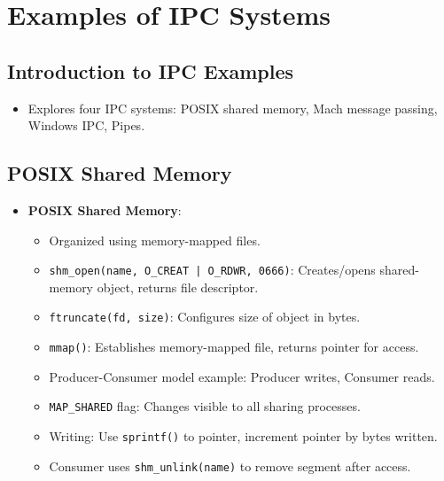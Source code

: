 \section{Examples of IPC Systems}\label{sec:3.7}

\subsection{Introduction to IPC Examples}
\begin{itemize}
    \item Explores four IPC systems: POSIX shared memory, Mach message passing, Windows IPC, Pipes.
\end{itemize}

\subsection{POSIX Shared Memory}
\begin{itemize}
    \item \textbf{POSIX Shared Memory}:
        \begin{itemize}
            \item Organized using memory-mapped files.
            \item \texttt{shm\_open(name, O\_CREAT | O\_RDWR, 0666)}: Creates/opens shared-memory object, returns file descriptor.
            \item \texttt{ftruncate(fd, size)}: Configures size of object in bytes.
            \item \texttt{mmap()}: Establishes memory-mapped file, returns pointer for access.
            \item Producer-Consumer model example: Producer writes, Consumer reads.
            \item \texttt{MAP\_SHARED} flag: Changes visible to all sharing processes.
            \item Writing: Use \texttt{sprintf()} to pointer, increment pointer by bytes written.
            \item Consumer uses \texttt{shm\_unlink(name)} to remove segment after access.
        \end{itemize}
\end{itemize}

